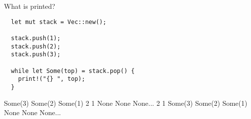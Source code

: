 %
%
What is printed?
\begin{lstlisting}
  let mut stack = Vec::new();

  stack.push(1);
  stack.push(2);
  stack.push(3);

  while let Some(top) = stack.pop() {
    print!("{} ", top);
  }
\end{lstlisting}
  \choice Some(3) Some(2) Some(1)
   2 1 None None None...
   2 1
  \choice Some(3) Some(2) Some(1) None None None...
